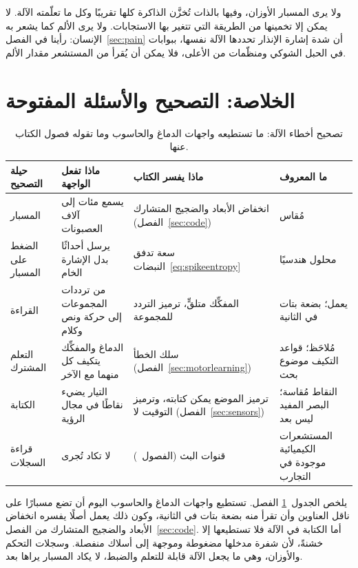 ولا يرى المسبار الأوزان، وفيها بالذات تُخزَّن الذاكرة كلها تقريبًا وكل ما تعلّمته الآلة. لا يمكن إلا تخمينها من الطريقة التي تتغير بها الاستجابات. ولا يرى الألم كما يشعر به الإنسان: رأينا في الفصل~\ref{sec:pain} أن شدة إشارة الإنذار تحددها الآلة نفسها، ببوابات في الحبل الشوكي ومنظّمات من الأعلى، فلا يمكن أن يُقرأ من المستشعر مقدار الألم.

\section{الخلاصة: التصحيح والأسئلة المفتوحة}

\begin{table}[t]
\centering
\footnotesize
\setlength{\tabcolsep}{4pt}
\renewcommand{\arraystretch}{1.15}
\begin{tabular}{>{\raggedright}p{2.2cm}>{\raggedright}p{3.6cm}>{\raggedright}p{3.4cm}>{\raggedright\arraybackslash}p{4.0cm}}
\toprule
حيلة التصحيح & ماذا تفعل الواجهة & ماذا يفسر الكتاب & ما المعروف \\
\midrule
المسبار & يسمع مئات إلى آلاف العصبونات & انخفاض الأبعاد والضجيج المتشارك (الفصل~\ref{sec:code}) & مُقاس \\
الضغط على المسبار & يرسل أحداثًا بدل الإشارة الخام & سعة تدفق النبضات~\eqref{eq:spikeentropy} & محلول هندسيًا \\
القراءة & من ترددات المجموعات إلى حركة ونص وكلام & المفكِّك متلقٍّ، ترميز التردد للمجموعة & يعمل؛ بضعة بتات في الثانية \\
التعلم المشترك & الدماغ والمفكِّك يتكيف كل منهما مع الآخر & سلك الخطأ (الفصل~\ref{sec:motorlearning}) & مُلاحَظ؛ قواعد التكيف موضوع بحث \\
الكتابة & التيار يضيء نقاطًا في مجال الرؤية & ترميز الموضع يمكن كتابته، وترميز التوقيت لا (الفصل~\ref{sec:sensors}) & النقاط مُقاسة؛ البصر المفيد ليس بعد \\
قراءة السجلات & لا تكاد تُجرى & قنوات البث (الفصول~\babelsublr{\ref{sec:serocomputer}--\ref{sec:acet}}) & المستشعرات الكيميائية موجودة في التجارب \\
\bottomrule
\end{tabular}
\caption{تصحيح أخطاء الآلة: ما تستطيعه واجهات الدماغ والحاسوب وما تقوله فصول الكتاب عنها.}
\label{tab:debugging}
\end{table}

يلخص الجدول~\ref{tab:debugging} الفصل. تستطيع واجهات الدماغ والحاسوب اليوم أن تضع مسبارًا على ناقل العناوين وأن تقرأ منه بضعة بتات في الثانية، وكون ذلك يعمل أصلًا يفسره انخفاض الأبعاد والضجيج المتشارك من الفصل~\ref{sec:code}. أما الكتابة في الآلة فلا تستطيعها إلا خشنةً، لأن شفرة مدخلها مضغوطة وموجهة إلى أسلاك منفصلة. وسجلات التحكم والأوزان، وهي ما يجعل الآلة قابلة للتعلم والضبط، لا يكاد المسبار يراها بعد.

